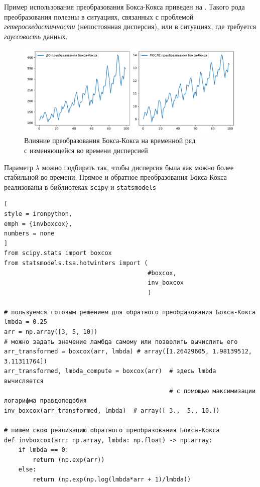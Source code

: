 \documentclass[%
	11pt,
	a4paper,
	utf8,
		]{article}
\begin{document}
Пример использования преобразования Бокса-Кокса приведен на . Такого рода преобразования полезны в ситуациях, связанных с проблемой \emph{гетероскедостичности} (непостоянная дисперсия), или в ситуациях, где требуется \emph{гауссовость} данных.

\begin{figure}[h]
	\centering
	\includegraphics[scale=0.70]{figures/boxcox.pdf}
	\caption{Влияние преобразования Бокса-Кокса на временной ряд\\с изменяющейся во времени дисперсией}\label{fig:boxcox}
\end{figure}

Параметр $ \lambda $ можно подбирать так, чтобы дисперсия была как можно более стабильной во времени. Прямое и обратное преобразования Бокса-Кокса реализованы в библиотеках \texttt{scipy} и \texttt{statsmodels}
\begin{lstlisting}[
style = ironpython,
emph = {invboxcox},
numbers = none
]
from scipy.stats import boxcox
from statsmodels.tsa.hotwinters import (
                                        #boxcox,
                                        inv_boxcox
                                        )

# пользуемся готовым решением для обратного преобразования Бокса-Кокса
lmbda = 0.25
arr = np.array([3, 5, 10])
# можно задать значение ламбда самому или позволить вычислить его
arr_transformed = boxcox(arr, lmbda) # array([1.26429605, 1.98139512, 3.11311764])
arr_transformed, lmbda_compute = boxcox(arr)  # здесь lmbda вычисляется
                                              # с помощью максимизации логарифма правдоподобия
inv_boxcox(arr_transformed, lmbda)  # array([ 3.,  5., 10.])

# пишем свою реализацию обратного преобразования Бокса-Кокса
def invboxcox(arr: np.array, lmbda: np.float) -> np.array:
    if lmbda == 0:
        return (np.exp(arr))
    else:
        return (np.exp(np.log(lmbda*arr + 1)/lmbda))
\end{lstlisting}
\end{document}
